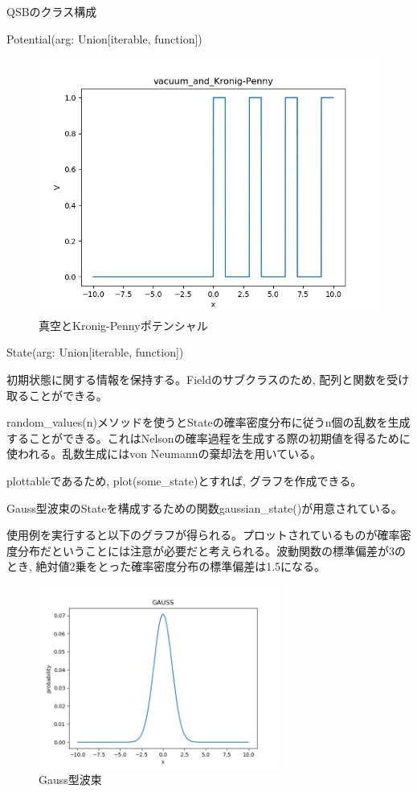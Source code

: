 \documentclass[a4paper, lualatex]{bxjsarticle}
\begin{document}
\begin{section}{QSBのクラス構成\label{AppQ}}
\begin{subsection}{Potential(arg: Union[iterable, function])}
\begin{figure}[h]
\begin{minipage}{0.5\hsize}
                \includegraphics[width=0.9\hsize]{vacuum_and_Kronig-Penny.png}
                \caption{真空とKronig-Pennyポテンシャル}
            \end{minipage}
        \end{figure}
    \end{subsection}

    \begin{subsection}{State(arg: Union[iterable, function])}
        \par 初期状態に関する情報を保持する。Fieldのサブクラスのため, 配列と関数を受け取ることができる。
        \par random\_values(n)メソッドを使うとStateの確率密度分布に従うn個の乱数を生成することができる。これはNelsonの確率過程を生成する際の初期値を得るために使われる。乱数生成にはvon Neumannの棄却法を用いている。
        \par plottableであるため, plot(some\_state)とすれば, グラフを作成できる。
        \par Gauss型波束のStateを構成するための関数gaussian\_state()が用意されている。
        
         使用例を実行すると以下のグラフが得られる。プロットされているものが確率密度分布だということには注意が必要だと考えられる。波動関数の標準偏差が3のとき, 絶対値2乗をとった確率密度分布の標準偏差は1.5になる。
         \begin{figure}[h]
            \centering
            \includegraphics[width=8cm]{GAUSS.png}
            \caption{Gauss型波束}
        \end{figure}
    \end{subsection}


\end{section}
\end{document}
